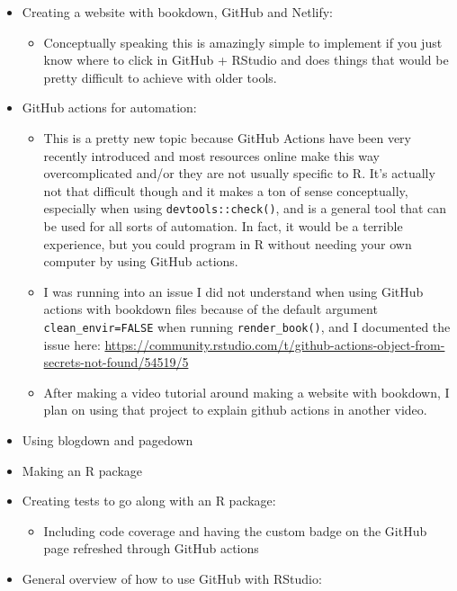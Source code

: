 \documentclass[
]{book}
\providecommand{\tightlist}{%
  \setlength{\itemsep}{0pt}\setlength{\parskip}{0pt}}
\begin{document}
\begin{itemize}
\item
  Creating a website with bookdown, GitHub and Netlify:

  \begin{itemize}
  \tightlist
  \item
    Conceptually speaking this is amazingly simple to implement if you just know where to click in GitHub + RStudio and does things that would be pretty difficult to achieve with older tools.
  \end{itemize}
\item
  GitHub actions for automation:

  \begin{itemize}
  \item
    This is a pretty new topic because GitHub Actions have been very recently introduced and most resources online make this way overcomplicated and/or they are not usually specific to R. It's actually not that difficult though and it makes a ton of sense conceptually, especially when using \texttt{devtools::check()}, and is a general tool that can be used for all sorts of automation. In fact, it would be a terrible experience, but you could program in R without needing your own computer by using GitHub actions.
  \item
    I was running into an issue I did not understand when using GitHub actions with bookdown files because of the default argument \texttt{clean\_envir=FALSE} when running \texttt{render\_book()}, and I documented the issue here: \url{https://community.rstudio.com/t/github-actions-object-from-secrets-not-found/54519/5}
  \item
    After making a video tutorial around making a website with bookdown, I plan on using that project to explain github actions in another video.
  \end{itemize}
\item
  Using blogdown and pagedown
\item
  Making an R package
\item
  Creating tests to go along with an R package:

  \begin{itemize}
  \tightlist
  \item
    Including code coverage and having the custom badge on the GitHub page refreshed through GitHub actions
  \end{itemize}
\item
  General overview of how to use GitHub with RStudio:


\end{itemize}
\end{document}
